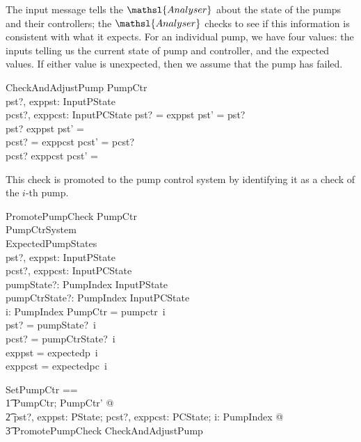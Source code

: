 \documentclass{report}
\renewcommand{\freetype}[1]{\mathsf{#1}}
\newcommand{\freetypepcfailed}{\freetype{pcfailed}}
\newcommand{\freetypepfailed}{\freetype{pfailed}}
\begin{document}
The input message tells the \( \mathsl{Analyser} \)\/ about the state
of the pumps and their controllers; the \( \mathsl{Analyser} \)\/
checks to see if this information is consistent with what it expects.
For an individual pump, we have four values: the inputs telling us the
current state of pump and controller, and the expected values.  If
either value is unexpected, then we assume that the pump has failed.
\begin{schema}{CheckAndAdjustPump}
  \Delta PumpCtr
  \\ %
  pst?, exppst: InputPState
  \\ %
  pcst?, exppcst: InputPCState
  \where %
  pst? = exppst \implies pst' = pst? \land {}
  \\ %
  pst? \neq exppst \implies pst' = \freetypepfailed \land {}
  \\ %
  pcst? = exppcst \implies pcst' = pcst? \land {}
  \\ %
  pcst? \neq exppcst \implies pcst' = \freetypepcfailed
\end{schema}
This check is promoted to the pump control system by identifying it as
a check of the \( i \)-th pump.
\begin{schema}{PromotePumpCheck}
  \Delta PumpCtr
  \\ %
  \Delta PumpCtrSystem
  \\ %
  ExpectedPumpStates
  \\ %
  pst?, exppst: InputPState
  \\ %
  pcst?, exppcst: InputPCState
  \\ %
  pumpState?: PumpIndex \fun InputPState
  \\ %
  pumpCtrState?: PumpIndex \fun InputPCState
  \\ %
  i: PumpIndex
  \where %
  \theta PumpCtr = pumpctr~i
  \\ %
  pst? = pumpState?~i
  \\ %
  pcst? = pumpCtrState?~i
  \\ %
  exppst = expectedp~i
  \\ %
  exppcst = expectedpc~i
\end{schema}
\begin{zed}
  SetPumpCtr ==
  \\ %
  \t1
    \exists PumpCtr; PumpCtr' @ %
    \\
    \t2
      \forall pst?, exppst: PState; pcst?, exppcst: PCState; %
      i: PumpIndex  @
      \\ %
      \t3 PromotePumpCheck \land CheckAndAdjustPump
\end{zed}
\end{document}
